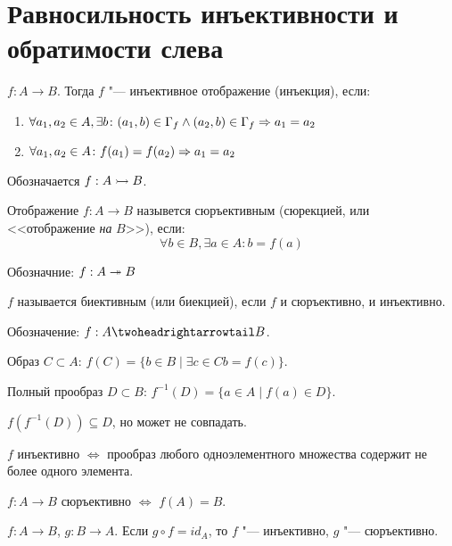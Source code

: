 ﻿\section{Равносильность инъективности и обратимости слева}

\begin{Def}
$f: A \to B$. Тогда $f$ "--- инъективное отображение (инъекция), если:

\begin{enumerate}
\item $\forall a_1, a_2 \in A, \exists b\colon (a_1, b) \in \Gamma_f \wedge (a_2, b) \in \Gamma_f \Rightarrow a_1 = a_2$
\item $\forall a_1, a_2 \in A\colon f(a_1) = f(a_2) \Rightarrow a_1 = a_2$
\end{enumerate}

Обозначается $f: A \rightarrowtail B$.
\end{Def}

\begin{Def}
Отображение $f: A \to B$ назывется сюръективным (сюрекцией, или <<отображение \textit{на} $B$>>), если:
\[\forall b \in B, \exists a \in A\colon b = f(a)\]

Обозначние: $f: A \twoheadrightarrow B$
\end{Def}

\begin{Def}
$f$ называется биективным (или биекцией), если $f$ и сюръективно, и инъективно.

Обозначение: $f: A \thrat B$.
\end{Def}

\begin{Def} 
Образ $C \subset A$: $f(C) = \{b \in B \mid \exists c \in C b = f(c)\}$.

Полный прообраз $D \subset B$: $f^{-1}(D) = \{a \in A \mid f(a) \in D\}$.
\end{Def}

$f(f^{-1}(D)) \subseteq D$, но может не совпадать.

$f$ инъективно $\iff$ прообраз любого одноэлементного множества содержит не более одного элемента.

$f : A \to B$ сюръективно $\iff$ $f(A) = B$.

\begin{theorem}{}
$f:A \to B$, $g:B \to A$. Если $g \circ f = id_A$, то $f$ "--- инъективно, $g$ "--- сюръективно.
\end{theorem}

